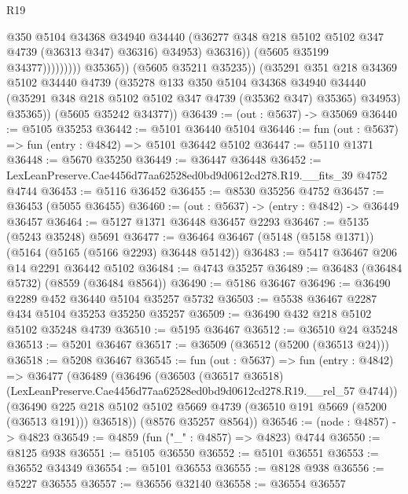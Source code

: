 \begin{lexlean}{R19}
\begin{coremodule}
{{{{{{{{{{{                                    @350
                                    @5104
                                    @34368
                                    @34940
                                    @34440
                                    (@36277 @348 @218 @5102 @5102 @347 @4739 (@36313 @347) @36316)
                                    @34953)
                                  @36316))
                              (@5605 @35199 @34377)))))))))
              @35365))
          (@5605 @35211 @35235))
        (@35291
          @351
          @218
          @34369
          @5102
          @34440
          @4739
          (@35278
            @133
            @350
            @5104
            @34368
            @34940
            @34440
            (@35291 @348 @218 @5102 @5102 @347 @4739 (@35362 @347) @35365)
            @34953)
          @35365))
      (@5605 @35242 @34377))
@36439 := (out : @5637) -> @35069
@36440 := @5105 @35253
@36442 := @5101 @36440 @5104
@36446 := fun (out : @5637) => fun (entry : @4842) => @5101 @36442 @5102
@36447 := @5110 @1371
@36448 := @5670 @35250
@36449 := @36447 @36448
@36452 := LexLeanPreserve.Cae4456d77aa62528ed0bd9d0612cd278.R19.__fits_39 @4752 @4744
@36453 := @5116 @36452
@36455 := @8530 @35256 @4752
@36457 := @36453 (@5055 @36455)
@36460 := (out : @5637) -> (entry : @4842) -> @36449 @36457
@36464 := @5127 @1371 @36448 @36457 @2293
@36467 := @5135 (@5243 @35248) @5691
@36477 := @36464 @36467 (@5148 (@5158 @1371)) (@5164 (@5165 (@5166 @2293) @36448 @5142))
@36483 := @5417 @36467 @206 @14 @2291 @36442 @5102
@36484 := @4743 @35257
@36489 := @36483 (@36484 @5732) (@8559 (@36484 @8564))
@36490 := @5186 @36467
@36496 := @36490 @2289 @452 @36440 @5104 @35257 @5732
@36503 := @5538 @36467 @2287 @434 @5104 @35253 @35250 @35257
@36509 := @36490 @432 @218 @5102 @5102 @35248 @4739
@36510 := @5195 @36467
@36512 := @36510 @24 @35248
@36513 := @5201 @36467
@36517 := @36509 (@36512 (@5200 (@36513 @24)))
@36518 := @5208 @36467
@36545 := fun (out : @5637) =>
  fun (entry : @4842) =>
  @36477
    (@36489
      (@36496
        (@36503
          (@36517 @36518)
          (LexLeanPreserve.Cae4456d77aa62528ed0bd9d0612cd278.R19.__rel_57 @4744))
        (@36490 @225 @218 @5102 @5102 @5669 @4739 (@36510 @191 @5669 (@5200 (@36513 @191))) @36518))
      (@8576 @35257 @8564))
@36546 := (node : @4857) -> @4823
@36549 := @4859 (fun ("_" : @4857) => @4823) @4744
@36550 := @8125 @938
@36551 := @5105 @36550
@36552 := @5101 @36551
@36553 := @36552 @34349
@36554 := @5101 @36553
@36555 := @8128 @938
@36556 := @5227 @36555
@36557 := @36556 @32140
@36558 := @36554 @36557
}}}}}}}}}}}
\end{coremodule}
\end{lexlean}
